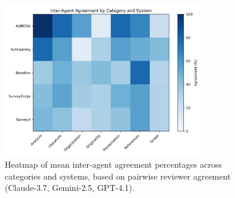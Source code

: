 
\begin{figure}[h]
    \centering
    \includegraphics[width=0.8\textwidth]{agreement_heatmap.png}
    \caption{Heatmap of mean inter-agent agreement percentages across categories and systems, based on pairwise reviewer agreement (Claude-3.7, Gemini-2.5, GPT-4.1).}
    \label{fig:agreement_heatmap}
\end{figure}
